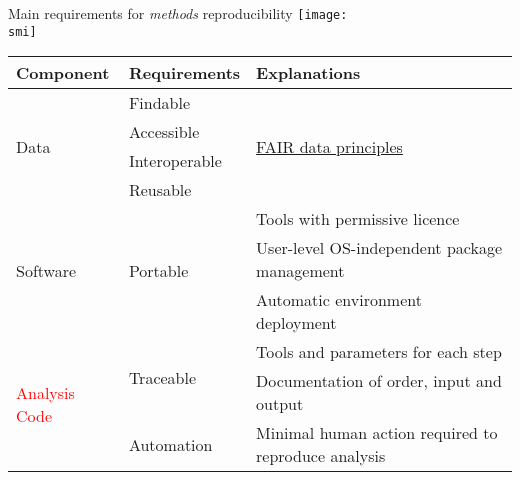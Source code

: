\documentclass[10pt, usenames, dvipsnames]{beamer}
\def\smi{out/ln/updir/mw-gcthesis-oral/library.bib}
\begin{document}
\begin{frame}{Main requirements for \emph{methods} reproducibility}
  \def\smi{out/ln/updir/mw-gcthesis-oral/ink/reproducibility/arrow_reproducibility.pdf}
  \texttt{[image: \\smi]}

  {\scriptsize
  \begin{tabular}{@{}lll@{}}
    \toprule
    Component                      & Requirements                & Explanations            \\ \midrule
    \multirow{4}{*}{\textcolor{NavyBlue}{Data}}          & Findable & \multirow{4}{*}{\href{https://www.force11.org/group/fairgroup/fairprinciples}{FAIR data principles}}   \\
    & Accessible                        &       \\
    & Interoperable                    &        \\ 
    & Reusable                          &       \\ \midrule
    \multirow{3}{*}{\textcolor{OliveGreen}{Software}}             & \multirow{3}{*}{Portable} & Tools with permissive licence \\
    & & User-level OS-independent package management            \\
    & & Automatic environment deployment           \\ \midrule
    \multirow{3}{*}{\textcolor{Red}{Analysis Code}} & \multirow{2}{*}{Traceable} & Tools and parameters for each step       \\
    & & Documentation of order, input and output \\ \cmidrule(l){2-3}
    & Automation & Minimal human action required to reproduce analysis \\ \bottomrule
  \end{tabular}
  }
\end{frame}
\end{document}
